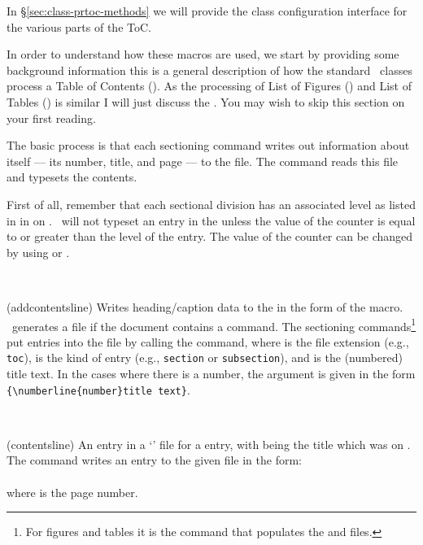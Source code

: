  In \S\ref{sec:class-prtoc-methods} we will provide the class
 configuration interface for the various parts of the ToC. 

 In order to understand how these macros are used, we start by
 providing some background information this is a general description
 of how the standard \ltx\ classes process a Table of Contents (\toc).
 As the processing of List of Figures (\lof) and List of Tables (\lot)
 is similar I will just discuss the \toc. You may wish to skip this
 section on your first reading.

    The basic process is that each sectioning command writes out information
about itself --- its number, title, and page --- to the  file.
The \cmd{\tableofcontents} command reads this file and typesets the contents.

    First of all, remember that each sectional division has an associated
level as listed in in  on 
. \ltx\ will not typeset an entry in the \toc{}
unless the value of the  counter is equal to or greater
than the level of the entry. The value of the  counter
can be changed by using \cmd{\setcounter} or \cmd{\settocdepth}.

\begin{syntax}
\cmd{\addcontentsline} \\
\end{syntax}
\glossary(addcontentsline)%
  {}%
  {Writes heading/caption data to the  in the form of
   the  macro.}
    \ltx\ generates a  file if the document contains a
 \cmd{\tableofcontents} command. The sectioning 
 commands\footnote{For figures and tables it is the 
 \cmd{\caption} command
 that populates the  and  files.}
 put entries into the  file by calling the 
 \cmd{\addcontentsline} 
 command, where  is the file extension (e.g., \texttt{toc}),
  is the kind of entry (e.g., \texttt{section} or \texttt{subsection}),
 and  is the (numbered) title text. In the cases where
 there is a number, the  argument is given in the
 form \verb?{\numberline{number}title text}?.

\begin{syntax}
\cmd{\contentsline} \\
\end{syntax}
\glossary(contentsline)%
  {}%
  {An entry in a `\listofx' file for a  entry, with
   being the title which was on .}
     The \cmd{\addcontentsline} command writes an entry to the given file
 in the form: \\
 \cmd{\contentsline} \\
 where  is the page number.

